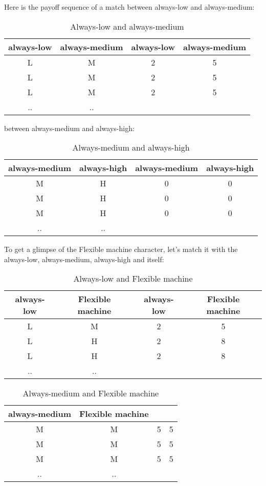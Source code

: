 \documentclass[12.5pt]{report}
\begin{document}
Here is the payoff sequence of a match between always-low and always-medium:
\begin{table}[h!]
\center
\begin{tabular}{cc|cc}
always-low & always-medium & always-low & always-medium\\
\hline
L & M & 2 & 5 \\
L & M & 2 & 5 \\
L & M & 2 & 5 \\
.. & ..\\
\end{tabular}
\caption{Always-low and always-medium}
\end{table}

between always-medium and always-high:
\begin{table}[h!]
\center
\begin{tabular}{cc|cc}
always-medium & always-high & always-medium & always-high\\
\hline
M & H & 0 & 0 \\
M & H & 0 & 0 \\
M & H & 0 & 0 \\
.. & ..\\
\end{tabular}
\caption{Always-medium and always-high}
\end{table}


To get a glimpse of the Flexible machine character, let's match it with the always-low, always-medium, always-high and itself:

\begin{table}[h!]
\center
\begin{tabular}{cc|cc}
always-low & Flexible machine & always-low & Flexible machine\\
\hline
L & M & 2 & 5 \\
L & H & 2 & 8 \\
L & H & 2 & 8 \\
.. & ..\\
\end{tabular}
\caption{Always-low and Flexible machine}
\end{table}

\begin{table}[h!]
\center
\begin{tabular}{cc|cc}
always-medium & Flexible machine & & \\
\hline
M & M & 5 & 5 \\
M & M & 5 & 5 \\
M & M & 5 & 5 \\
.. & ..\\
\end{tabular}
\caption{Always-medium and Flexible machine}
\end{table}
\end{document}
